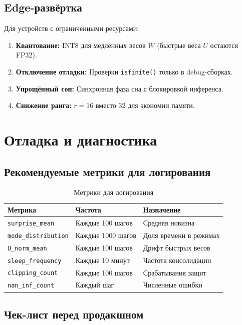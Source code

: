 \subsection{Edge-развёртка}

Для устройств с ограниченными ресурсами:

\begin{enumerate}
    \item \textbf{Квантование:} INT8 для медленных весов $W$ (быстрые веса $U$ остаются FP32).
    \item \textbf{Отключение отладки:} Проверки \texttt{isfinite()} только в debug-сборках.
    \item \textbf{Упрощённый сон:} Синхронная фаза сна с блокировкой инференса.
    \item \textbf{Снижение ранга:} $r = 16$ вместо 32 для экономии памяти.
\end{enumerate}

\section{Отладка и диагностика}

\subsection{Рекомендуемые метрики для логирования}

\begin{table}[h]
\centering
\caption{Метрики для логирования}
\label{tab:logging_metrics}
\begin{tabular}{lp{4cm}p{5cm}}
\toprule
\textbf{Метрика} & \textbf{Частота} & \textbf{Назначение} \\
\midrule
\texttt{surprise\_mean} & Каждые 100 шагов & Средняя новизна \\
\texttt{mode\_distribution} & Каждые 1000 шагов & Доля времени в режимах \\
\texttt{U\_norm\_mean} & Каждые 100 шагов & Дрифт быстрых весов \\
\texttt{sleep\_frequency} & Каждые 10 минут & Частота консолидации \\
\texttt{clipping\_count} & Каждые 100 шагов & Срабатывания защит \\
\texttt{nan\_inf\_count} & Каждый шаг & Численные ошибки \\
\bottomrule
\end{tabular}
\end{table}

\subsection{Чек-лист перед продакшном}

